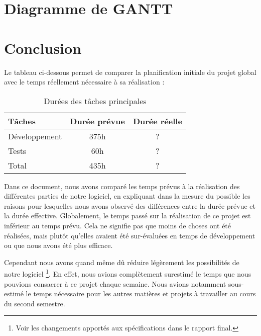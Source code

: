 \documentclass[a4paper]{report}
\begin{document}
\chapter{Diagramme de GANTT}


\chapter{Conclusion}

Le tableau ci-dessous permet de comparer la planification initiale du projet global avec le temps réellement nécessaire à sa réalisation :

\begin{table}[H]
\centering
  \begin{tabularx}{0.8\textwidth}{| X | c | c |}
    \hline
	Tâches & Durée prévue & Durée réelle \\
    \hline
    Développement & 375h & ?\\
    Tests & 60h & ?\\
    \hline
	Total & 435h & ?\\
    \hline
  \end{tabularx}
  \caption{Durées des tâches principales}
\end{table}

Dans ce document, nous avons comparé les temps prévus à la réalisation des différentes parties de notre logiciel, en expliquant dans la mesure du possible les raisons pour lesquelles nous avons observé des différences entre la durée prévue et la durée effective.
Globalement, le temps passé sur la réalisation de ce projet est inférieur au temps prévu.
Cela ne signifie pas que moins de choses ont été réalisées, mais plutôt qu'elles avaient été sur-évaluées en temps de développement ou que nous avons été plus efficace.

Cependant nous avons quand même dû réduire légèrement les possibilités de notre logiciel \footnote{Voir les changements apportés aux spécifications dans le rapport final.}.
En effet, nous avions complètement surestimé le temps que nous pouvions consacrer à ce projet chaque semaine.
Nous avions notamment sous-estimé le temps nécessaire pour les autres matières et projets à travailler au cours du second semestre.
\end{document}
